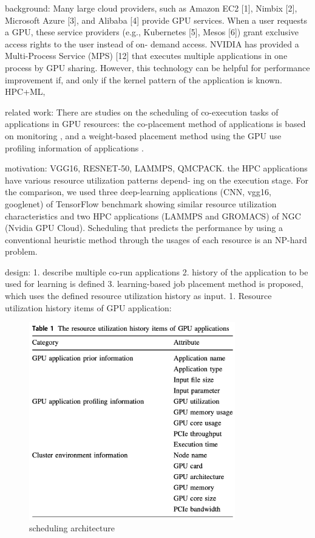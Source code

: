 \documentclass[UTF8]{article}
\begin{document}
    background: Many large cloud providers, such as Amazon EC2 [1], Nimbix [2], Microsoft Azure [3], and Alibaba [4] provide GPU services. When a user requests a GPU, these service providers (e.g., Kubernetes [5], Mesos [6]) grant exclusive access rights to the user instead of on- demand access. NVIDIA has provided a Multi-Process Service (MPS) [12] that executes multiple applications in one process by GPU sharing. However, this technology can be helpful for performance improvement if, and only if the kernel pattern of the application is known. HPC+ML, 
    
    related work: There are studies on the scheduling of co-execution tasks of applications in GPU resources: the co-placement method of applications is based on monitoring \cite{chang2017kubernetes,gu2018gaiagpu}, and a weight-based placement method using the GPU use profiling information of applications \cite{hong2017fairgv}.  
    
    motivation:  VGG16, RESNET-50, LAMMPS, QMCPACK. the HPC applications have various resource utilization patterns depend- ing on the execution stage. For the comparison, we used three deep-learning applications (CNN, vgg16, googlenet) of TensorFlow benchmark showing similar resource utilization characteristics and two HPC applications (LAMMPS and GROMACS) of NGC (Nvidia GPU Cloud). Scheduling that predicts the performance by using a conventional heuristic method through the usages of each resource is an NP-hard problem. 
    
    design: 1. describe multiple co-run applications 2. history of the application to be used for learning is defined 3. learning-based job placement method is proposed, which uses the defined resource utilization history as input.   1. Resource utilization history items of GPU application: 
    
    \begin{figure}[htbp]
    \caption{scheduling architecture}
    \centering
    \includegraphics[width=0.8\textwidth]{GPUAPP.png}
    \end{figure}
\end{document}
